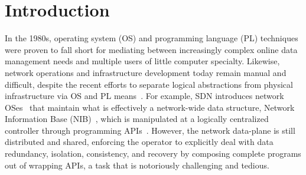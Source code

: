 \section{Introduction}
\label{sec:intro}


In the 1980s, operating system (OS) and programming language (PL)
techniques were proven to fall short for mediating between
increasingly complex online data management needs and multiple users
of little computer specialty. Likewise, network operations and
infrastructure development today remain manual and difficult, despite
the recent efforts to separate logical abstractions from physical
infrastructure via OS and PL
means~\cite{ethane-sigcomm07,rethinking-enterprise,shenker-tue}. For
example, SDN introduces network OSes~\cite{onix,nox} that maintain
what is effectively a
network-wide data structure, \eg Network Information Base
(NIB)~\cite{onix}, which is manipulated at a logically centralized
controller through programming
APIs~\cite{composing,sdn-lang-frenetic}. However, the network
data-plane is still distributed and shared, enforcing the operator to
explicitly deal with data redundancy, isolation, consistency, and
recovery by composing complete programs out of wrapping APIs, a task
that is notoriously challenging and tedious.  



